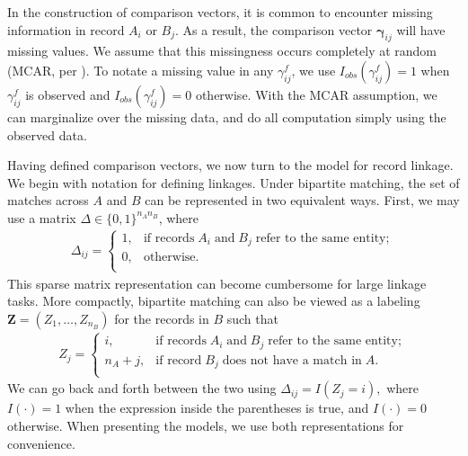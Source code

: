 \documentclass[ba]{imsart}
\begin{document}
In the construction of comparison vectors, it is common to encounter missing information in record $A_i$ or $B_j$. As a result, the comparison vector $\mathbf{\gamma}_{ij}$ will have missing values. We assume that this missingness occurs completely at random (MCAR, per \cite{LittleRubin2002}). To notate a missing value in any $\gamma_{ij}^f$, we use $I_{obs}(\gamma_{ij}^f)=1$ when $\gamma_{ij}^f$ is observed and $I_{obs}(\gamma_{ij}^f)=0$ otherwise. With the MCAR assumption, we can marginalize over the missing data, and do all computation simply using the observed data.

Having defined comparison vectors, we now turn to the \cite{fellegi_theory_1969} model for record linkage.  We begin with notation for defining linkages. Under bipartite matching, the set of matches across $A$ and $B$ can be represented in two equivalent ways. First, we may use a matrix $\Delta \in \{0, 1\}^{n_An_B}$, where
\begin{align}
\Delta_{ij} =
\begin{cases}
1, & \text{if records}\;  A_i \; \text{and}\; B_j \; \text{refer to the same entity}; \\
0, & \text{otherwise}.\\
\end{cases}
\end{align}
This sparse matrix representation can become cumbersome for large linkage tasks. More compactly, bipartite matching can also be viewed as a labeling $\bm{Z} = (Z_1, \ldots, Z_{n_B})$ for the records in $B$ such that
\begin{align}
Z_{j} =
\begin{cases}
i, & \text{if records}\;  A_i \; \text{and}\; B_j  \; \text{refer to the same entity}; \\
n_A + j, & \text{if record}\;  B_j \; \text{does not have a match in}\; A. \\
\end{cases}
\end{align}
We can go back and forth between the two using $\Delta_{ij} = I(Z_j = i),$ where $I(\cdot) = 1$ when the expression inside the parentheses is true, and $I(\cdot) = 0$ otherwise. When presenting the models, we use both representations for convenience.
\end{document}
